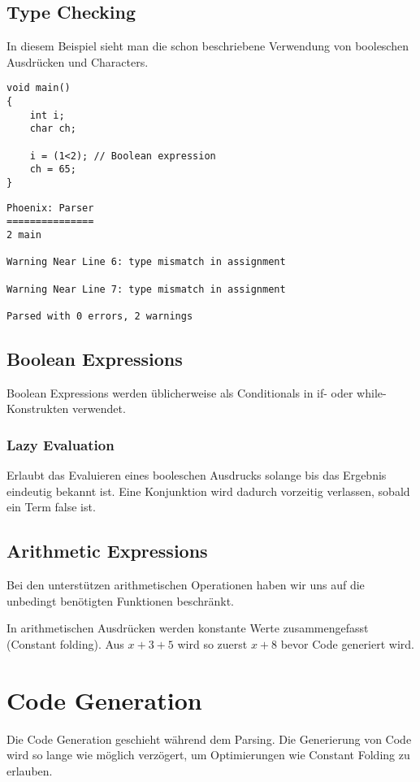 \documentclass[a4paper,12pt]{article}
\begin{document}
	\subsection{Type Checking}
	In diesem Beispiel sieht man die schon beschriebene Verwendung von booleschen Ausdrücken und Characters.

	\begin{lstlisting}[title=types.c,frame=single]
void main()
{
	int i;
	char ch;

	i = (1<2); // Boolean expression
	ch = 65;
}\end{lstlisting}

	\begin{lstlisting}[title=Ausgabe des Compilers,frame=single]
Phoenix: Parser
===============
2 main

Warning Near Line 6: type mismatch in assignment

Warning Near Line 7: type mismatch in assignment

Parsed with 0 errors, 2 warnings
\end{lstlisting}

	\subsection{Boolean Expressions}

	Boolean Expressions werden üblicherweise als Conditionals in if- oder while-Konstrukten verwendet.

	\subsubsection{Lazy Evaluation}

	Erlaubt das Evaluieren eines booleschen Ausdrucks solange bis das Ergebnis eindeutig bekannt ist.
	Eine Konjunktion wird dadurch vorzeitig verlassen, sobald ein Term false ist.

	\subsection{Arithmetic Expressions}
	Bei den unterstützen arithmetischen Operationen haben wir uns auf die unbedingt benötigten Funktionen beschränkt.

	In arithmetischen Ausdrücken werden konstante Werte zusammengefasst (Constant folding).
	Aus $x + 3 + 5$ wird so zuerst $x+8$ bevor Code generiert wird.

	\section{Code Generation}
	Die Code Generation geschieht während dem Parsing.
	Die Generierung von Code wird so lange wie möglich verzögert, um Optimierungen wie Constant Folding zu erlauben.
\end{document}
